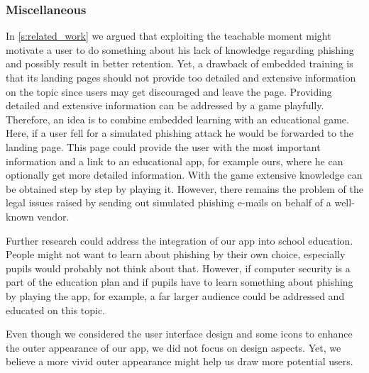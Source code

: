 \subsubsection{Miscellaneous}
\begin{description}[leftmargin=0cm]
\item[Combination of Embedded Training and an Education Application:] In \autoref{s:related_work} we argued that exploiting the teachable moment might motivate a user to do something about his lack of knowledge regarding phishing and possibly result in better retention.
	Yet, a drawback of embedded training is that its landing pages should not provide too detailed and extensive information on the topic since users may get discouraged and leave the page.
	Providing detailed and extensive information can be addressed by a game playfully.
	Therefore, an idea is to combine embedded learning with an educational game.
	Here, if a user fell for a simulated phishing attack he would be forwarded to the landing page.
	This page could provide the user with the most important information and a link to an educational app, for example ours, where he can optionally get more detailed information.
	With the game extensive knowledge can be obtained step by step by playing it.
However, there remains the problem of the legal issues raised by sending out simulated phishing e-mails on behalf of a well-known vendor.

\item[Integration of App into School Education:] Further research could address the integration of our app into school education.
People might not want to learn about phishing by their own choice, especially pupils would probably not think about that.
However, if computer security is a part of the education plan and if pupils have to learn something about phishing by playing the app, for example, a far larger audience could be addressed and educated on this topic.

\item[More Appealing Outer Appearance:] Even though we considered the user interface design and some icons to enhance the outer appearance of our app, we did not focus on design aspects.
Yet, we believe a more vivid outer appearance might help us draw more potential users.
\end{description}

